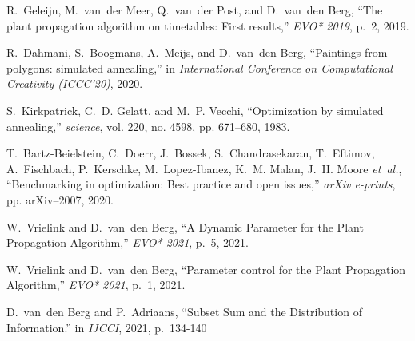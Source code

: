 \documentclass[10pt,conference,compsocconf]{IEEEtran}
\begin{document}
\begin{thebibliography}{10}
R.~Geleijn, M.~van~der Meer, Q.~van~der Post, and D.~van~den Berg, ``The plant
  propagation algorithm on timetables: First results,'' \emph{EVO* 2019}, p.~2,
  2019.

R.~Dahmani, S.~Boogmans, A.~Meijs, and D.~van~den Berg,
  ``Paintings-from-polygons: simulated annealing,'' in \emph{International
  Conference on Computational Creativity (ICCC'20)}, 2020.

S.~Kirkpatrick, C.~D. Gelatt, and M.~P. Vecchi, ``Optimization by simulated
  annealing,'' \emph{science}, vol. 220, no. 4598, pp. 671--680, 1983.

T.~Bartz-Beielstein, C.~Doerr, J.~Bossek, S.~Chandrasekaran, T.~Eftimov,
  A.~Fischbach, P.~Kerschke, M.~Lopez-Ibanez, K.~M. Malan, J.~H. Moore
  \emph{et~al.}, ``Benchmarking in optimization: Best practice and open
  issues,'' \emph{arXiv e-prints}, pp. arXiv--2007, 2020.

W.~Vrielink and D.~van~den Berg, ``A Dynamic Parameter for the Plant Propagation Algorithm,'' \emph{EVO* 2021}, p.~5,
  2021.

W.~Vrielink and D.~van~den Berg, ``Parameter control for the Plant Propagation Algorithm,'' \emph{EVO* 2021}, p.~1,
  2021.

D.~van~den Berg and P.~Adriaans, ``Subset Sum and the Distribution of Information.'' in \emph{IJCCI}, 2021, p.~134-140


\end{thebibliography}





\end{document}
